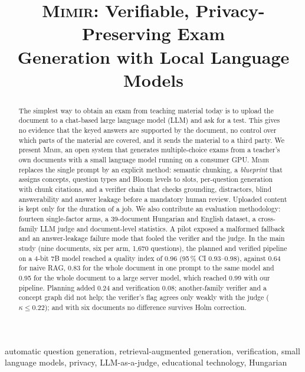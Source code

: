 \documentclass[conference]{IEEEtran}
\newcommand{\Mimir}{\textsc{Mimir}}
\begin{document}
\title{\Mimir{}: Verifiable, Privacy-Preserving Exam\\Generation with Local Language Models}

\author{
\IEEEauthorblockN{[Author 1], [Author 2], [Author 3]}
}

\maketitle

\begin{abstract}
The simplest way to obtain an exam from teaching material today is to upload the document to a
chat-based large language model (LLM) and ask for a test. This gives no evidence that the keyed
answers are supported by the document, no control over which parts of the material are covered,
and it sends the material to a third party. We present \Mimir{}, an open system that generates
multiple-choice exams from a teacher's own documents with a small language model running on a
consumer GPU. \Mimir{} replaces the single prompt by an explicit method: semantic chunking, a
\emph{blueprint} that assigns concepts, question types and Bloom levels to slots, per-question
generation with chunk citations, and a verifier chain that checks grounding, distractors, blind
answerability and answer leakage before a mandatory human review. Uploaded content is kept only for the
duration of a job. We also contribute an evaluation methodology: fourteen single-factor arms, a 39-document Hungarian
and English dataset, a cross-family LLM judge and document-level statistics. A pilot exposed a malformed
fallback and an answer-leakage failure mode that fooled the verifier and the judge. In the main study
(nine documents, six per arm, 1{,}670 questions), the planned and verified pipeline on a 4-bit 7B model
reached a quality index of 0.96 (95\,\% CI 0.93--0.98), against 0.64 for naive RAG, 0.83 for the whole
document in one prompt to the same model and 0.95 for the whole document to a large server model, which
reached 0.99 with our pipeline. Planning added 0.24 and verification 0.08; another-family verifier and a
concept graph did not help; the verifier's flag agrees only weakly with the judge ($\kappa\le0.22$); and
with six documents no difference survives Holm correction.
\end{abstract}

\begin{IEEEkeywords}
automatic question generation, retrieval-augmented generation, verification, small language models,
privacy, LLM-as-a-judge, educational technology, Hungarian
\end{IEEEkeywords}
\end{document}
